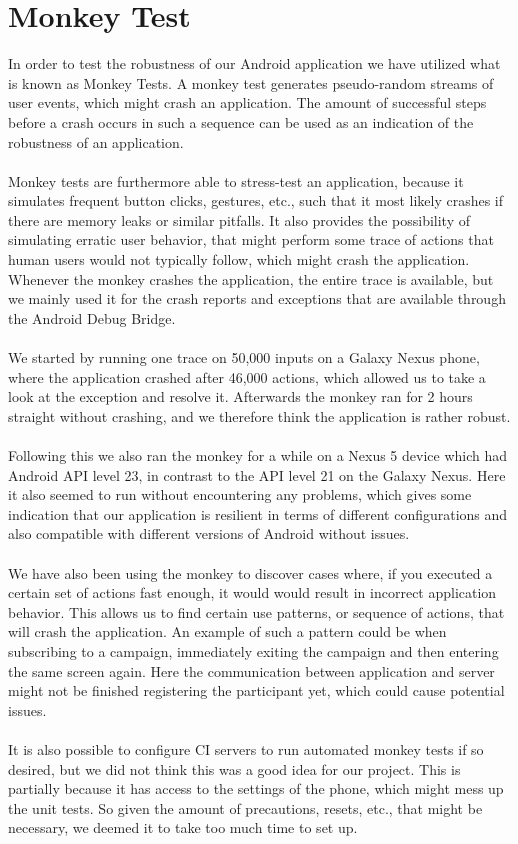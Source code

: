 
\section{Monkey Test}
\label{sec:monkey_test}
In order to test the robustness of our Android application we have utilized what is known as Monkey Tests. A monkey test generates pseudo-random streams of user events, which might crash an application. The amount of successful steps before a crash occurs in such a sequence can be used as an indication of the robustness of an application.  
\\\\
Monkey tests are furthermore able to stress-test an application, because it simulates frequent button clicks, gestures, etc., such that it most likely crashes if there are memory leaks or similar pitfalls. It also provides the possibility of simulating erratic user behavior, that might perform some trace of actions that human users would not typically follow, which might crash the application. Whenever the monkey crashes the application, the entire trace is available, but we mainly used it for the crash reports and exceptions that are available through the Android Debug Bridge. 
\\\\
We started by running one trace on 50,000 inputs on a Galaxy Nexus phone, where the application crashed after 46,000 actions, which allowed us to take a look at the exception and resolve it. Afterwards the monkey ran for 2 hours straight without crashing, and we therefore think the application is rather robust.
\\\\
Following this we also ran the monkey for a while on a Nexus 5 device which had Android API level 23, in contrast to the API level 21 on the Galaxy Nexus. Here it also seemed to run without encountering any problems, which gives some indication that our application is resilient in terms of different configurations and also compatible with different versions of Android without issues.
\\\\
We have also been using the monkey to discover cases where, if you executed a certain set of actions fast enough, it would would result in incorrect application behavior. This allows us to find certain use patterns, or sequence of actions, that will crash the application. An example of such a pattern could be when subscribing to a campaign, immediately exiting the campaign and then entering the same screen again. Here the communication between application and server might not be finished registering the participant yet, which could cause potential issues.
\\\\
It is also possible to configure CI servers to run automated monkey tests if so desired, but we did not think this was a good idea for our project. This is partially because it has access to the settings of the phone, which might mess up the unit tests. So given the amount of precautions, resets, etc., that might be necessary, we deemed it to take too much time to set up. 
